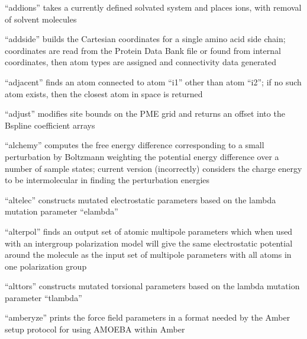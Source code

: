 \documentclass[letterpaper,11pt,english]{sphinxmanual}
\begin{document}

“addions” takes a currently defined solvated system and
places ions, with removal of solvent molecules


“addside” builds the Cartesian coordinates for a single amino
acid side chain; coordinates are read from the Protein Data
Bank file or found from internal coordinates, then atom types
are assigned and connectivity data generated


“adjacent” finds an atom connected to atom “i1” other than
atom “i2”; if no such atom exists, then the closest atom
in space is returned


“adjust” modifies site bounds on the PME grid and returns
an offset into the B\sphinxhyphen{}spline coefficient arrays


“alchemy” computes the free energy difference corresponding
to a small perturbation by Boltzmann weighting the potential
energy difference over a number of sample states; current
version (incorrectly) considers the charge energy to be
intermolecular in finding the perturbation energies


“altelec” constructs mutated electrostatic parameters based
on the lambda mutation parameter “elambda”


“alterpol” finds an output set of atomic multipole parameters
which when used with an intergroup polarization model will
give the same electrostatic potential around the molecule as
the input set of multipole parameters with all atoms in one
polarization group


“alttors” constructs mutated torsional parameters based
on the lambda mutation parameter “tlambda”


“amberyze” prints the force field parameters in a format needed
by the Amber setup protocol for using AMOEBA within Amber

\end{document}
